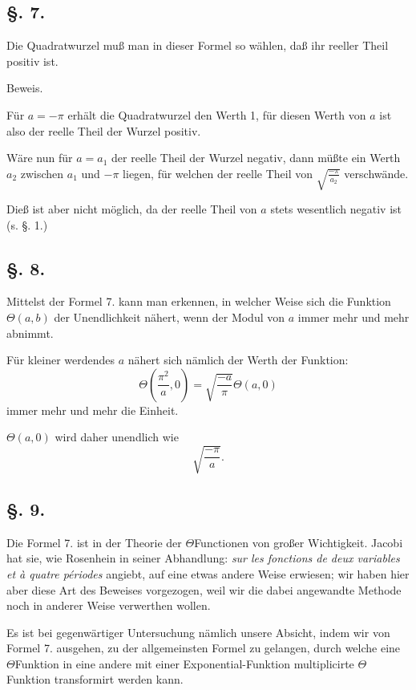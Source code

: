 \documentclass[10pt]{article}
\newcommand{\sourceanchor}[1]{\hypertarget{source-#1}{}}
\begin{document}
\subsection*{\S. 7.}
Die Quadratwurzel muß man in dieser Formel so wählen, daß ihr reeller Theil positiv ist.

\begin{center}Beweis.\end{center}
Für \(a=-\pi\) erhält die Quadratwurzel den Werth 1, für diesen Werth von \(a\) ist also der reelle Theil der Wurzel positiv.

Wäre nun für \(a=a_{1}\) der reelle Theil der Wurzel negativ, dann müßte ein Werth \(a_{2}\) zwischen \(a_{1}\) und \(-\pi\) liegen, für welchen der reelle Theil von \(\sqrt{\frac{-\pi}{a_{2}}}\) verschwände.

Dieß ist aber nicht möglich, da der reelle Theil von \(a\) stets wesentlich negativ ist (s. \S. 1.)

\subsection*{\S. 8.}
Mittelst der Formel 7. kann man erkennen, in welcher Weise sich die Funktion \(\Theta(a,b)\) der Unendlichkeit nähert, wenn der Modul von \(a\) immer mehr und mehr abnimmt.

Für kleiner werdendes \(a\) nähert sich nämlich der Werth der Funktion:
\[
\Theta\!\left(\frac{\pi^{2}}{a},0\right)=\sqrt{\frac{-a}{\pi}}\Theta(a,0)
\]
immer mehr und mehr die Einheit.

\(\Theta(a,0)\) wird daher unendlich wie
\[
\sqrt{\frac{-\pi}{a}}.
\]

\subsection*{\S. 9.}
Die Formel 7. ist in der Theorie der \(\Theta\)Functionen von großer Wichtigkeit. Jacobi hat sie, wie Rosenhein in seiner Abhandlung: \textit{sur les fonctions de deux variables et à quatre périodes} angiebt, auf eine etwas andere Weise erwiesen; wir haben hier aber diese Art des Beweises vorgezogen, weil wir die dabei angewandte Methode noch in anderer Weise verwerthen wollen.

\sourceanchor{PA08}
Es ist bei gegenwärtiger Untersuchung nämlich unsere Absicht, indem wir von Formel 7. ausgehen, zu der allgemeinsten Formel zu gelangen, durch welche eine \(\Theta\)Funktion in eine andere mit einer Exponential-Funktion multiplicirte \(\Theta\)Funktion transformirt werden kann.
\end{document}
